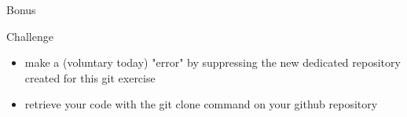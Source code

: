 \begin{frame}{Bonus}
\begin{exampleblock}{Challenge}
\begin{itemize}
    \item make a (voluntary today) "error" by suppressing the new dedicated repository created for this git exercise
    \item retrieve your code with the git clone command on your github repository
\end{itemize}
\end{exampleblock}
\end{frame}